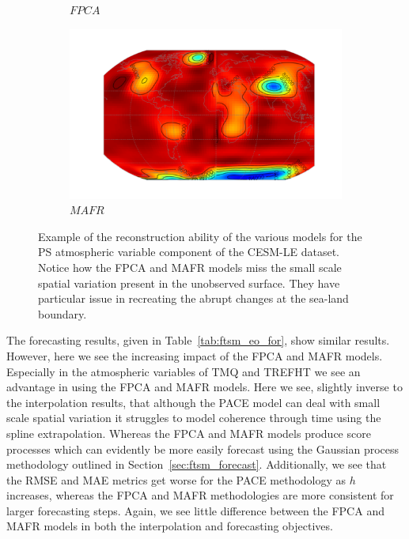 \begin{figure}
\begin{subfigure}[b]{0.45\textwidth}
 		\caption{$FPCA$}
 		\label{fig:ftsm_res_ps_fpca}
 	\end{subfigure}
 	\begin{subfigure}[b]{0.45\textwidth}
 		\includegraphics[width=\textwidth]{ftsm_res_ps_example_mafr}
 		\caption{$MAFR$}
 		\label{fig:ftsm_res_ps_mafr}
 	\end{subfigure}  
 	\caption[Example of the reconstruction ability of the various models for the PS atmospheric variable component of the CESM-LE dataset.]{Example of the reconstruction ability of the various models for the PS atmospheric variable component of the CESM-LE dataset. Notice how the FPCA and MAFR models miss the small scale spatial variation present in the unobserved surface. They have particular issue in recreating the abrupt changes at the sea-land boundary.}
 	\label{fig:ftsm_res_ps}
 \end{figure}

The forecasting results, given in Table~\ref{tab:ftsm_eo_for}, show similar results.
However, here we see the increasing impact of the FPCA and MAFR models. 
Especially in the atmospheric variables of TMQ and TREFHT we see an advantage in using the FPCA and MAFR models.
Here we see, slightly inverse to the interpolation results, that although the PACE model can deal with small scale spatial variation it struggles to model coherence through time using the spline extrapolation.
Whereas the FPCA and MAFR models produce score processes which can evidently be more easily forecast using the Gaussian process methodology outlined in Section~\ref{sec:ftsm_forecast}.
Additionally, we see that the RMSE and MAE metrics get worse for the PACE methodology as $h$ increases, whereas the FPCA and MAFR methodologies are more consistent for larger forecasting steps.
Again, we see little difference between the FPCA and MAFR models in both the interpolation and forecasting objectives. 


